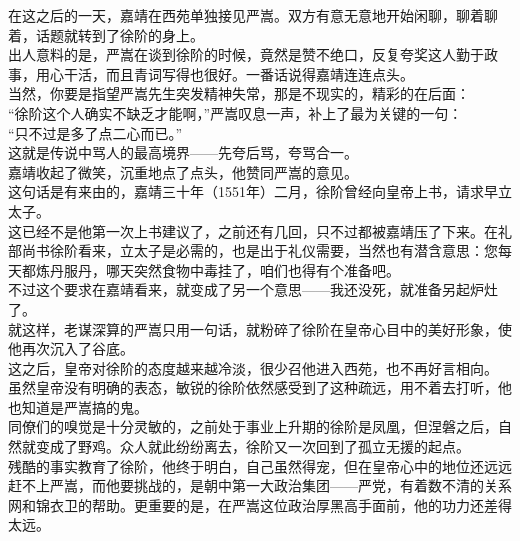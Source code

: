 \begin{multicols}{\theparacolNo}
在这之后的一天，嘉靖在西苑单独接见严嵩。双方有意无意地开始闲聊，聊着聊着，话题就转到了徐阶的身上。\\

出人意料的是，严嵩在谈到徐阶的时候，竟然是赞不绝口，反复夸奖这人勤于政事，用心干活，而且青词写得也很好。一番话说得嘉靖连连点头。\\

当然，你要是指望严嵩先生突发精神失常，那是不现实的，精彩的在后面：\\

“徐阶这个人确实不缺乏才能啊，”严嵩叹息一声，补上了最为关键的一句：\\

“只不过是多了点二心而已。”\\

这就是传说中骂人的最高境界——先夸后骂，夸骂合一。\\

嘉靖收起了微笑，沉重地点了点头，他赞同严嵩的意见。\\

这句话是有来由的，嘉靖三十年（1551年）二月，徐阶曾经向皇帝上书，请求早立太子。\\

这已经不是他第一次上书建议了，之前还有几回，只不过都被嘉靖压了下来。在礼部尚书徐阶看来，立太子是必需的，也是出于礼仪需要，当然也有潜含意思：您每天都炼丹服丹，哪天突然食物中毒挂了，咱们也得有个准备吧。\\

不过这个要求在嘉靖看来，就变成了另一个意思——我还没死，就准备另起炉灶了。\\

就这样，老谋深算的严嵩只用一句话，就粉碎了徐阶在皇帝心目中的美好形象，使他再次沉入了谷底。\\

这之后，皇帝对徐阶的态度越来越冷淡，很少召他进入西苑，也不再好言相向。\\

虽然皇帝没有明确的表态，敏锐的徐阶依然感受到了这种疏远，用不着去打听，他也知道是严嵩搞的鬼。\\

同僚们的嗅觉是十分灵敏的，之前处于事业上升期的徐阶是凤凰，但涅磐之后，自然就变成了野鸡。众人就此纷纷离去，徐阶又一次回到了孤立无援的起点。\\

残酷的事实教育了徐阶，他终于明白，自己虽然得宠，但在皇帝心中的地位还远远赶不上严嵩，而他要挑战的，是朝中第一大政治集团——严党，有着数不清的关系网和锦衣卫的帮助。更重要的是，在严嵩这位政治厚黑高手面前，他的功力还差得太远。\\


\end{multicols}

